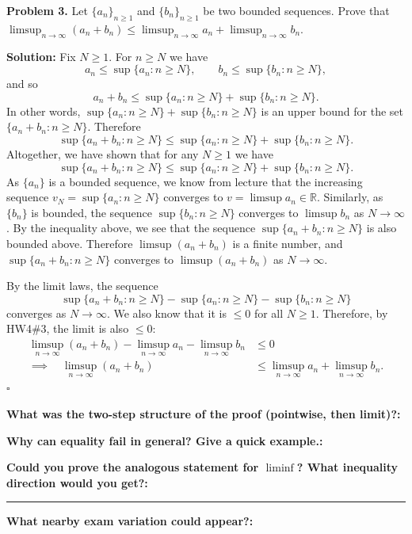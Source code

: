 \documentclass[12pt]{article}
\newcommand{\fillfield}[1]{%
  \par\noindent\textbf{#1:}\enspace\hrulefill\par\vspace{3pt}%
}
\newcommand{\fillfieldlong}[1]{%
  \par\noindent\textbf{#1:}\par\vspace{1.5cm}%
  \noindent\rule{\linewidth}{0.35pt}\par\vspace{4pt}%
}
\begin{document}
\newpage

\begin{tcolorbox}[
  enhanced, breakable,
  colback  = solgreen,
  colframe = green!45!black,
  fonttitle = \bfseries,
  title = {\textsc{Official Solution}\hfill Homework 5 -- Selected Solutions}
]
\textbf{Problem 3.}
Let $\{a_n\}_{n \geq 1}$ and $\{b_n\}_{n \geq 1}$ be two bounded sequences.
Prove that
$\displaystyle\limsup_{n \to \infty}(a_n + b_n)
\leq \limsup_{n \to \infty} a_n + \limsup_{n \to \infty} b_n$.

\medskip
\textbf{Solution:}
Fix $N \geq 1$.
For $n \geq N$ we have
\[
  a_n \leq \sup\{a_n : n \geq N\},
  \qquad
  b_n \leq \sup\{b_n : n \geq N\},
\]
and so
\[
  a_n + b_n \leq \sup\{a_n : n \geq N\} + \sup\{b_n : n \geq N\}.
\]
In other words, $\sup\{a_n : n \geq N\} + \sup\{b_n : n \geq N\}$ is an upper
bound for the set $\{a_n + b_n : n \geq N\}$.
Therefore
\[
  \sup\{a_n + b_n : n \geq N\} \leq \sup\{a_n : n \geq N\} + \sup\{b_n : n \geq N\}.
\]
Altogether, we have shown that for any $N \geq 1$ we have
\[
  \sup\{a_n + b_n : n \geq N\} \leq \sup\{a_n : n \geq N\} + \sup\{b_n : n \geq N\}.
\]
As $\{a_n\}$ is a bounded sequence, we know from lecture that the increasing
sequence $v_N = \sup\{a_n : n \geq N\}$ converges to $v = \limsup a_n \in \mathbb{R}$.
Similarly, as $\{b_n\}$ is bounded, the sequence $\sup\{b_n : n \geq N\}$
converges to $\limsup b_n$ as $N \to \infty$.
By the inequality above, we see that the sequence $\sup\{a_n + b_n : n \geq N\}$
is also bounded above.
Therefore $\limsup(a_n + b_n)$ is a finite number, and
$\sup\{a_n + b_n : n \geq N\}$ converges to $\limsup(a_n + b_n)$ as $N \to \infty$.

By the limit laws, the sequence
\[
  \sup\{a_n + b_n : n \geq N\} - \sup\{a_n : n \geq N\} - \sup\{b_n : n \geq N\}
\]
converges as $N \to \infty$.
We also know that it is $\leq 0$ for all $N \geq 1$.
Therefore, by HW4\#3, the limit is also $\leq 0$:
\begin{align*}
  \limsup_{n \to \infty}(a_n + b_n)
  - \limsup_{n \to \infty} a_n
  - \limsup_{n \to \infty} b_n
  &\leq 0 \\[4pt]
  \implies \quad
  \limsup_{n \to \infty}(a_n + b_n)
  &\leq \limsup_{n \to \infty} a_n + \limsup_{n \to \infty} b_n.
\end{align*}
\hfill$\square$
\end{tcolorbox}

\bigskip

\begin{tcolorbox}[
  enhanced, breakable,
  colback  = reflectcyan,
  colframe = cyan!55!black,
  fonttitle = \bfseries,
  title = {\textsc{Reflection \& Variation}}
]
\fillfield{What was the two-step structure of the proof (pointwise, then limit)?}
\fillfield{Why can equality fail in general? Give a quick example.}
\fillfieldlong{%
  Could you prove the analogous statement for $\liminf$?
  What inequality direction would you get?}
\fillfield{What nearby exam variation could appear?}
\end{tcolorbox}
\end{document}
